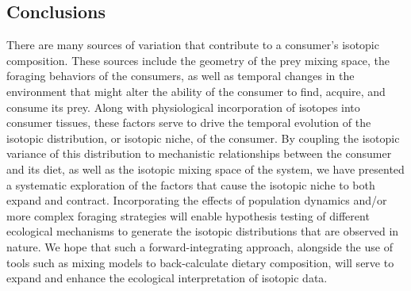 \documentclass{frontiersSCNS}
\begin{document}




%

\subsection*{Conclusions}

There are many sources of variation that contribute to a consumer's isotopic composition.
These sources include the geometry of the prey mixing space, the foraging behaviors of the consumers, as well as temporal changes in the environment that might alter the ability of the consumer to find, acquire, and consume its prey.
Along with physiological incorporation of isotopes into consumer tissues, these factors serve to drive the temporal evolution of the isotopic distribution, or isotopic niche, of the consumer.
By coupling the isotopic variance of this distribution to mechanistic relationships between the consumer and its diet, as well as the isotopic mixing space of the system, we have presented a systematic exploration of the factors that cause the isotopic niche to both expand and contract.
Incorporating the effects of population dynamics and/or more complex foraging strategies will enable hypothesis testing of different ecological mechanisms to generate the isotopic distributions that are observed in nature.
We hope that such a forward-integrating approach, alongside the use of tools such as mixing models to back-calculate dietary composition, will serve to expand and enhance the ecological interpretation of isotopic data.
\end{document}
